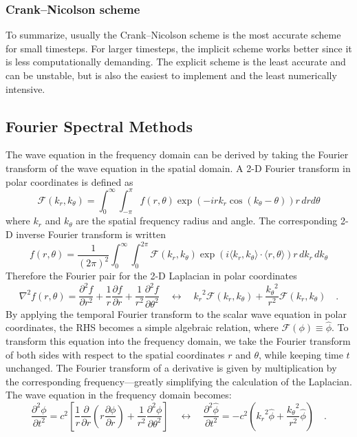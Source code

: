 \documentclass{homework}
\begin{document}
\subsubsection{Crank–Nicolson scheme}
To summarize, usually the Crank–Nicolson scheme is the most accurate scheme for small timesteps. For larger timesteps, the implicit scheme works better since it is less computationally demanding. The explicit scheme is the least accurate and can be unstable, but is also the easiest to implement and the least numerically intensive.

\newpage
\subsection{Fourier Spectral Methods}

The wave equation in the frequency domain can be derived by taking the Fourier transform of the wave equation in the spatial domain. A 2-D Fourier transform in polar coordinates is defined as 
$$ \mathcal{F}(k_r, k_\theta) = \int_0^\infty \int_{-\pi}^\pi f(r, \theta) \exp(-i r k_r \cos(k_\theta - \theta)) r \, dr d\theta $$
\noindent
where $k_r$ and $k_\theta$ are the spatial frequency radius and angle. The corresponding 2-D inverse Fourier transform is written
$$ f(r, \theta) = \frac{1}{(2 \pi)^2} \int_0^\infty \int_{0}^{2\pi} \mathcal{F}(k_r, k_\theta) \exp(i \langle k_r, k_\theta \rangle \cdot \langle r, \theta \rangle) r \, d k_r \, d k_\theta $$
\noindent
Therefore the Fourier pair for the 2-D Laplacian in polar coordinates
$$ \nabla^2 f(r, \theta) = \frac{\partial^2 f}{\partial r^2} + \frac{1}{r} \frac{\partial f}{\partial r} + \frac{1}{r^2} \frac{\partial^2 f}{\partial \theta^2} \quad \longleftrightarrow \quad {k_r}^2 \mathcal{F}(k_r, k_\theta) + \frac{{k_{\theta}}^2}{r^2} \mathcal{F}(k_r, k_\theta) \quad \textrm{.}$$
\noindent
By applying the temporal Fourier transform to the scalar wave equation in polar coordinates, the RHS becomes a simple algebraic relation, where $\mathcal{F}(\phi) \equiv \hat{\phi}$. To transform this equation into the frequency domain, we take the Fourier transform of both sides with respect to the spatial coordinates $r$ and $\theta$, while keeping time $t$ unchanged. The Fourier transform of a derivative is given by multiplication by the corresponding frequency---greatly simplifying the calculation of the Laplacian. The wave equation in the frequency domain becomes:
$$ \frac{{\partial^2 \phi}}{{\partial t^2}} = c^2 \left[ \frac{1}{r} \frac{\partial}{\partial r} \left(r \frac{\partial \phi}{\partial r}\right) + \frac{1}{r^2} \frac{\partial^2 \phi}{\partial \theta^2} \right] \quad \longleftrightarrow \quad \frac{{\partial^2 \hat{\phi}}}{{\partial t^2}} = -c^2 \left( {k_r}^2 \hat{\phi} + \frac{{k_{\theta}}^2}{r^2} \hat{\phi} \right)  \quad \textrm{.}$$
\end{document}
